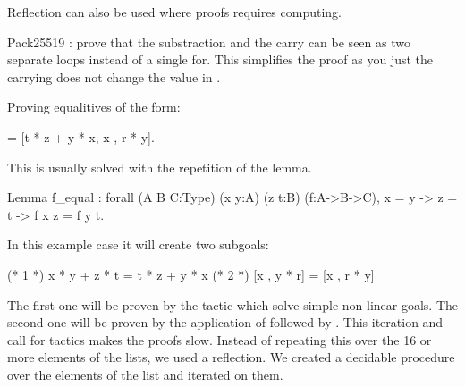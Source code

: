 Reflection can also be used where proofs requires computing.


Pack25519 :
prove that the substraction and the carry can be seen as two separate loops instead of a single for.
This simplifies the proof as you just the carrying does not change the value in \Zfield.

Proving equalitives of the form:

\begin{coqD}
[x * y + z * t, x , y * r] =
[t * z + y * x, x , r * y].
\end{coqD}

This is usually solved with the repetition of the  lemma.

\begin{coqD}
Lemma f_equal :
  forall (A B C:Type) (x y:A) (z t:B) (f:A->B->C),
  x = y -> z = t ->
  f x z = f y t.
\end{coqD}
In this example case it will create two subgoals:
\begin{coqD}
(* 1 *)
x * y + z * t = t * z + y * x
(* 2 *)
[x , y * r] = [x , r * y]
\end{coqD}
The first one will be proven by the  tactic which solve simple non-linear goals.
The second one will be proven by the application of 
followed by . This iteration and call for tactics makes the proofs slow.
Instead of repeating this over the 16 or more elements of the lists, we used a reflection.
We created a decidable procedure over the elements of the list and iterated on them.
